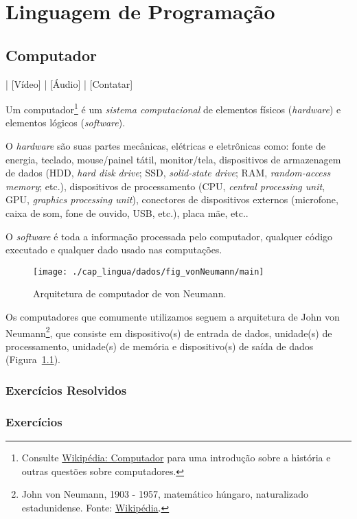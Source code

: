 
\chapter{Linguagem de Programação}\label{cap_lingua}
\thispagestyle{fancy}

\section{Computador}\label{cap_lim_sec_computador}

\begin{flushright}
  [YouTube] | [Vídeo] | [Áudio] | [Contatar]
\end{flushright}

Um computador\footnote{Consulte \href{https://pt.wikipedia.org/wiki/Computador}{Wikipédia: Computador} para uma introdução sobre a história e outras questões sobre computadores.} é um \emph{sistema computacional} de elementos físicos (\emph{hardware}) e elementos lógicos (\emph{software}).

O \emph{hardware} são suas partes mecânicas, elétricas e eletrônicas como: fonte de energia, teclado, mouse/painel tátil, monitor/tela, dispositivos de armazenagem de dados (HDD, {\it hard disk drive}; SSD, {\it solid-state drive}; RAM, {\it random-access memory}; etc.), dispositivos de processamento (CPU, {\it central processing unit}, GPU, {\it graphics processing unit}), conectores de dispositivos externos (microfone, caixa de som, fone de ouvido, USB, etc.), placa mãe, etc..

O \emph{software} é toda a informação processada pelo computador, qualquer código executado e qualquer dado usado nas computações.

\begin{figure}[H]
  \centering
  \texttt{[image: ./cap\_lingua/dados/fig\_vonNeumann/main]}
  \caption[Arquitetura de von Neumann]{Arquitetura de computador de von Neumann.}
  \label{cap_lim_sec_computador:fig:arqVonNeumann}
\end{figure}

Os computadores que comumente utilizamos seguem a arquitetura de John von Neumann\footnote{John von Neumann, 1903 - 1957, matemático húngaro, naturalizado estadunidense. Fonte: \href{https://pt.wikipedia.org/wiki/John_von_Neumann}{Wikipédia}.}, que consiste em dispositivo(s) de entrada de dados, unidade(s) de processamento, unidade(s) de memória e dispositivo(s) de saída de dados (Figura~\ref{cap_lim_sec_computador:fig:arqVonNeumann}).

\emconstrucao

\subsection{Exercícios Resolvidos}

\emconstrucao

\subsection{Exercícios}

\emconstrucao
